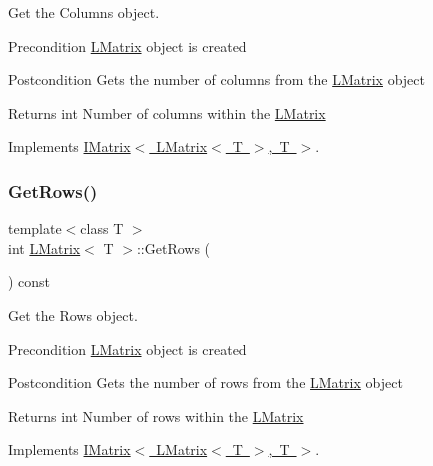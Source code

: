 Get the Columns object. 

\begin{DoxyPrecond}{Precondition}
\mbox{\hyperlink{class_l_matrix}{L\+Matrix}} object is created 
\end{DoxyPrecond}
\begin{DoxyPostcond}{Postcondition}
Gets the number of columns from the \mbox{\hyperlink{class_l_matrix}{L\+Matrix}} object 
\end{DoxyPostcond}
\begin{DoxyReturn}{Returns}
int Number of columns within the \mbox{\hyperlink{class_l_matrix}{L\+Matrix}} 
\end{DoxyReturn}


Implements \mbox{\hyperlink{class_i_matrix_a3b84da3898ef38bdf281c13f218fc278}{I\+Matrix$<$ L\+Matrix$<$ T $>$, T $>$}}.

\mbox{\label{class_l_matrix_ad4ed9d329dbd01d010504a97b3879442}} 
\subsubsection{\texorpdfstring{GetRows()}{GetRows()}}
{\footnotesize\ttfamily template$<$class T $>$ \\
int \mbox{\hyperlink{class_l_matrix}{L\+Matrix}}$<$ T $>$\+::Get\+Rows (\begin{DoxyParamCaption}{ }\end{DoxyParamCaption}) const\hspace{0.3cm}{\ttfamily [virtual]}}



Get the Rows object. 

\begin{DoxyPrecond}{Precondition}
\mbox{\hyperlink{class_l_matrix}{L\+Matrix}} object is created 
\end{DoxyPrecond}
\begin{DoxyPostcond}{Postcondition}
Gets the number of rows from the \mbox{\hyperlink{class_l_matrix}{L\+Matrix}} object 
\end{DoxyPostcond}
\begin{DoxyReturn}{Returns}
int Number of rows within the \mbox{\hyperlink{class_l_matrix}{L\+Matrix}} 
\end{DoxyReturn}


Implements \mbox{\hyperlink{class_i_matrix_a58632b018f4023768db7963e22f468da}{I\+Matrix$<$ L\+Matrix$<$ T $>$, T $>$}}.

